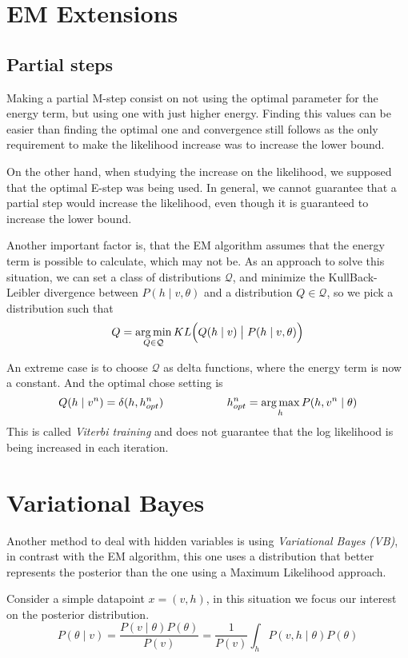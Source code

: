 \section{EM Extensions}

\subsection{Partial steps}

Making a partial M-step consist on not using the optimal parameter for the energy term, but using one with just higher energy. Finding this values can be easier than finding the optimal one and convergence still follows as the only requirement to make the likelihood increase was to increase the lower bound.

On the other hand, when studying the increase on the likelihood, we supposed that the optimal E-step was being used. In general, we cannot guarantee that a partial step would increase the likelihood, even though it is guaranteed to increase the lower bound.

Another important factor is, that the EM algorithm assumes that the energy term is possible to calculate, which may not be. As an approach to solve this situation, we can set a class of distributions \(\mathcal{Q}\), and minimize the KullBack-Leibler divergence between \(P(h \mid v, \theta)\) and a distribution \(Q \in \mathcal{Q}\), so we pick a distribution such that
\[
  Q = \operatorname*{arg\,min}_{Q \in \mathcal{Q}} KL\Big(Q(h \mid v) \bigm| P(h\mid v, \theta)\Big)
\]

An extreme case is to choose \(\mathcal{Q}\) as delta functions, where the energy term is now a constant. And the optimal chose setting is
\[
Q(h \mid v^{n}) = \delta (h, h^{n}_{opt}) \hspace{2cm} h^{n}_{opt} = \operatorname*{arg\,max}_{h}P(h , v^{n} \mid \theta)
\]
This is called \emph{Viterbi training} and does not guarantee that the log likelihood is being increased in each iteration.

\section{Variational Bayes}

Another method to deal with hidden variables is using \emph{Variational Bayes (VB)}, in contrast with the EM algorithm, this one uses a distribution that better represents the posterior than the one using a Maximum Likelihood approach.

Consider a simple datapoint \(x = (v,h)\), in this situation we focus our interest on the posterior distribution.
\[
  P(\theta \mid v) = \frac{P(v \mid \theta)P(\theta)}{P(v)} = \frac{1}{P(v)}\int_{h}P(v,h \mid \theta)P(\theta)
\]

